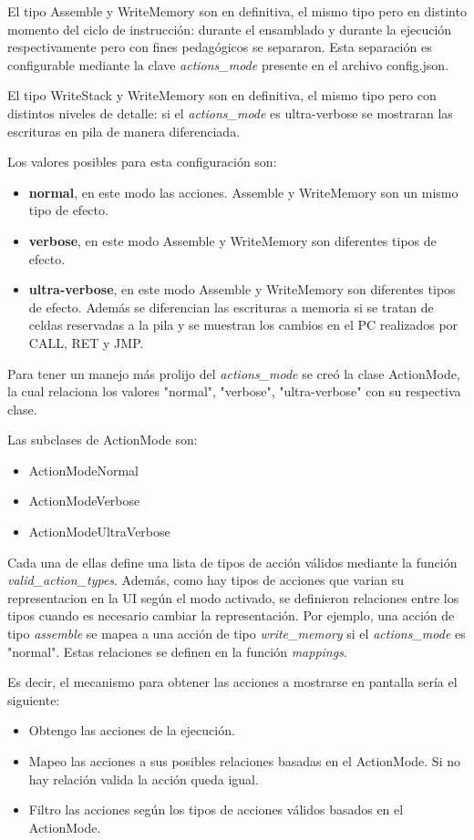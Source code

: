 \documentclass{article}
\begin{document}
El tipo Assemble y WriteMemory son en definitiva, el mismo tipo pero en distinto momento del ciclo de instrucción: durante el ensamblado y durante la ejecución respectivamente pero con fines pedagógicos se separaron. Esta separación es configurable mediante la clave \textit{actions\_mode} presente en el archivo config.json.

El tipo WriteStack y WriteMemory son en definitiva, el mismo tipo pero con distintos niveles de detalle: si el \textit{actions\_mode} es ultra-verbose se mostraran las escrituras en pila de manera diferenciada.

Los valores posibles para esta configuración son:
\begin{itemize}
\item \textbf{normal}, en este modo las acciones. Assemble y WriteMemory son un mismo tipo de efecto.
\item \textbf{verbose}, en este modo Assemble y WriteMemory son diferentes tipos de efecto.
\item \textbf{ultra-verbose}, en este modo Assemble y WriteMemory son diferentes tipos de efecto. Además se diferencian las escrituras a memoria si se tratan de celdas reservadas a la pila y se muestran los cambios en el PC realizados por CALL, RET y JMP.
\end{itemize}

Para tener un manejo más prolijo del \textit{actions\_mode} se creó la clase ActionMode, la cual relaciona los valores "normal", "verbose", "ultra-verbose" con su respectiva clase.

Las subclases de ActionMode son:
\begin{itemize}
\item ActionModeNormal
\item ActionModeVerbose
\item ActionModeUltraVerbose
\end{itemize}

Cada una de ellas define una lista de tipos de acción válidos mediante la función \textit{valid\_action\_types}. 
Además, como hay tipos de acciones que varian su representacion en la UI según el modo activado, se definieron relaciones entre los tipos cuando es necesario cambiar la representación. Por ejemplo, una acción de tipo \textit{assemble} se mapea a una acción de tipo \textit{write\_memory} si el \textit{actions\_mode} es "normal". Estas relaciones se definen en la función \textit{mappings}.

Es decir, el mecanismo para obtener las acciones a mostrarse en pantalla sería el siguiente:
\begin{itemize}
\item Obtengo las acciones de la ejecución.
\item Mapeo las acciones a sus posibles relaciones basadas en el ActionMode. Si no hay relación valida la acción queda igual.
\item Filtro las acciones según los tipos de acciones válidos basados en el ActionMode.
\end{itemize}
\end{document}
